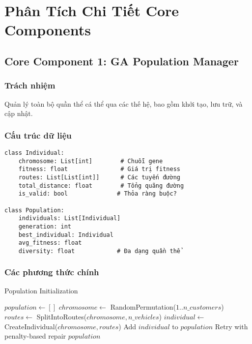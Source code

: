 \documentclass[12pt,a4paper]{article}
\begin{document}
\newpage

\section{Phân Tích Chi Tiết Core Components}

\subsection{Core Component 1: GA Population Manager}

\subsubsection{Trách nhiệm}
Quản lý toàn bộ quần thể cá thể qua các thế hệ, bao gồm khởi tạo, lưu trữ, và cập nhật.

\subsubsection{Cấu trúc dữ liệu}

\begin{verbatim}
class Individual:
    chromosome: List[int]        # Chuỗi gene
    fitness: float               # Giá trị fitness
    routes: List[List[int]]      # Các tuyến đường
    total_distance: float        # Tổng quãng đường
    is_valid: bool              # Thỏa ràng buộc?
    
class Population:
    individuals: List[Individual]
    generation: int
    best_individual: Individual
    avg_fitness: float
    diversity: float            # Đa dạng quần thể
\end{verbatim}

\subsubsection{Các phương thức chính}

\begin{algorithm}
\caption{Population Initialization}
\begin{algorithmic}[1]
    \State $population \gets []$
        \State $chromosome \gets$ RandomPermutation($1..n\_customers$)
        \State $routes \gets$ SplitIntoRoutes($chromosome, n\_vehicles$)
            \State $individual \gets$ CreateIndividual($chromosome, routes$)
            \State Add $individual$ to $population$
        \Else
            \State Retry with penalty-based repair
        \EndIf
    \EndFor
    \State \Return $population$
\EndFunction
\end{algorithmic}
\end{algorithm}
\end{document}
